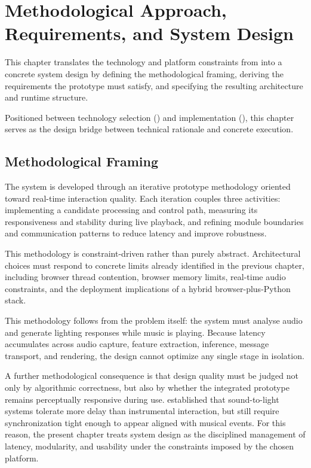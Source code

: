 \chapter{Methodological Approach, Requirements, and System Design}
\label{chap:methodology-requirements-system-design}

This chapter translates the technology and platform constraints from  into a concrete system design by defining the methodological framing, deriving the requirements the prototype must satisfy, and specifying the resulting architecture and runtime structure.

Positioned between technology selection () and implementation (), this chapter serves as the design bridge between technical rationale and concrete execution.

\section{Methodological Framing}

The system is developed through an iterative prototype methodology oriented toward real-time interaction quality. Each iteration couples three activities: implementing a candidate processing and control path, measuring its responsiveness and stability during live playback, and refining module boundaries and communication patterns to reduce latency and improve robustness.

This methodology is constraint-driven rather than purely abstract. Architectural choices must respond to concrete limits already identified in the previous chapter, including browser thread contention, browser memory limits, real-time audio constraints, and the deployment implications of a hybrid browser-plus-Python stack.

This methodology follows from the problem itself: the system must analyse audio and generate lighting responses while music is playing. Because latency accumulates across audio capture, feature extraction, inference, message transport, and rendering, the design cannot optimize any single stage in isolation.

A further methodological consequence is that design quality must be judged not only by algorithmic correctness, but also by whether the integrated prototype remains perceptually responsive during use.  established that sound-to-light systems tolerate more delay than instrumental interaction, but still require synchronization tight enough to appear aligned with musical events. For this reason, the present chapter treats system design as the disciplined management of latency, modularity, and usability under the constraints imposed by the chosen platform.

